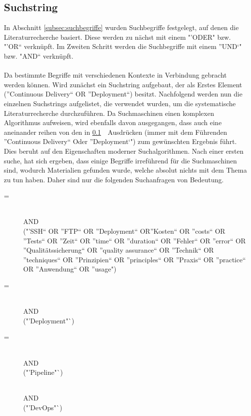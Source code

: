\subsection{Suchstring}
\label{subsec:suchstring}
In Abschnitt \ref{subsec:suchbegriffe}  wurden Suchbegriffe festgelegt, auf denen die Literaturrecherche basiert. Diese werden zu nächst mit einem "'ODER" bzw. "'OR"` verknüpft. Im Zweiten Schritt werden die Suchbegriffe mit einem "'UND`" bzw. "AND"` verknüpft.
\\\\
Da bestimmte Begriffe mit verschiedenen Kontexte in Verbindung gebracht werden können. Wird zunächst ein Suchstring aufgebaut, der als Erstes Element ("'Continuous Delivery"` OR "'Deployment"`) besitzt. Nachfolgend werden nun die einzelnen Suchstrings aufgelistet, die verwendet wurden, um die systematische Literaturrecherche durchzuführen. Da Suchmaschinen einen komplexen Algorithmus aufweisen, wird ebenfalls davon ausgegangen, dass auch eine aneinander reihen von den in \ref{subsec:suchstring}\ \ Ausdrücken (immer mit dem Führenden "'Continuous Delivery"` Oder "'Deployment`") zum gewünschten Ergebnis führt. Dies beruht auf den Eigenschaften moderner Suchalgorithmen.
Nach einer ersten suche, hat sich ergeben, dass einige Begriffe irreführend für die Suchmaschinen sind, wodurch Materialien gefunden wurde, welche absolut nichts mit dem Thema zu tun haben. Daher sind nur die folgenden Suchanfragen von Bedeutung.

\begin{description}
	\item[ =] \suchstringPrefix \\AND\\ ("'SSH"` OR "'FTP"` OR "'Deployment"` OR"'Kosten"` OR "'costs"` OR "'Tests"` OR "'Zeit"` OR "'time"` OR "'duration"` OR "'Fehler"` OR "'error"` OR "'Qualitätssicherung"` OR "'quality assurance"` OR "'Technik"` OR "'techniques"` OR "'Prinzipien"` OR "'principles"` OR "'Praxis"` OR "'practice"` OR "'Anwendung"` OR "'usage")
    
    \item[ =] \suchstringPrefix \\AND\\ ("'Deployment"`)
    
    \item[ =] \suchstringPrefix \\AND\\ ("'Pipeline"`)
    
    \item[] \suchstringPrefix \\AND\\ ("'DevOps"`)
\end{description}\noindent

